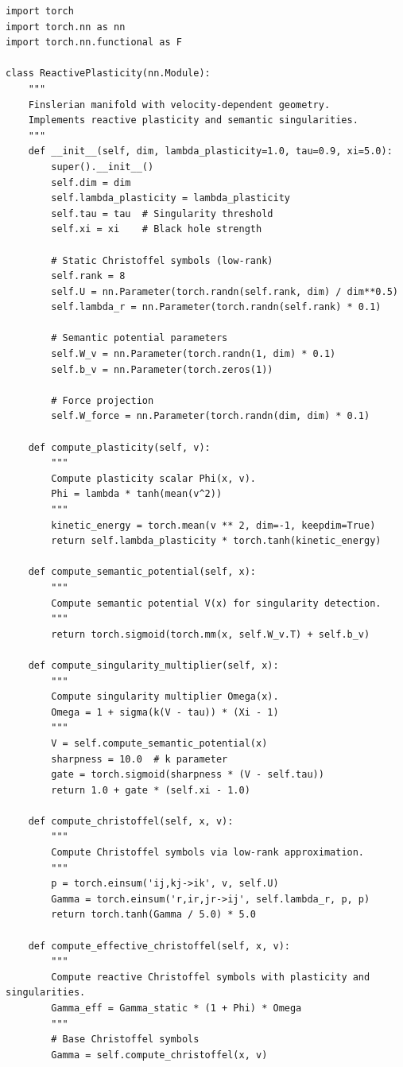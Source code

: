\documentclass[12pt,letterpaper,twoside]{article}
\begin{document}
\begin{verbatim}
import torch
import torch.nn as nn
import torch.nn.functional as F

class ReactivePlasticity(nn.Module):
    """
    Finslerian manifold with velocity-dependent geometry.
    Implements reactive plasticity and semantic singularities.
    """
    def __init__(self, dim, lambda_plasticity=1.0, tau=0.9, xi=5.0):
        super().__init__()
        self.dim = dim
        self.lambda_plasticity = lambda_plasticity
        self.tau = tau  # Singularity threshold
        self.xi = xi    # Black hole strength
        
        # Static Christoffel symbols (low-rank)
        self.rank = 8
        self.U = nn.Parameter(torch.randn(self.rank, dim) / dim**0.5)
        self.lambda_r = nn.Parameter(torch.randn(self.rank) * 0.1)
        
        # Semantic potential parameters
        self.W_v = nn.Parameter(torch.randn(1, dim) * 0.1)
        self.b_v = nn.Parameter(torch.zeros(1))
        
        # Force projection
        self.W_force = nn.Parameter(torch.randn(dim, dim) * 0.1)
        
    def compute_plasticity(self, v):
        """
        Compute plasticity scalar Phi(x, v).
        Phi = lambda * tanh(mean(v^2))
        """
        kinetic_energy = torch.mean(v ** 2, dim=-1, keepdim=True)
        return self.lambda_plasticity * torch.tanh(kinetic_energy)
    
    def compute_semantic_potential(self, x):
        """
        Compute semantic potential V(x) for singularity detection.
        """
        return torch.sigmoid(torch.mm(x, self.W_v.T) + self.b_v)
    
    def compute_singularity_multiplier(self, x):
        """
        Compute singularity multiplier Omega(x).
        Omega = 1 + sigma(k(V - tau)) * (Xi - 1)
        """
        V = self.compute_semantic_potential(x)
        sharpness = 10.0  # k parameter
        gate = torch.sigmoid(sharpness * (V - self.tau))
        return 1.0 + gate * (self.xi - 1.0)
    
    def compute_christoffel(self, x, v):
        """
        Compute Christoffel symbols via low-rank approximation.
        """
        p = torch.einsum('ij,kj->ik', v, self.U)
        Gamma = torch.einsum('r,ir,jr->ij', self.lambda_r, p, p)
        return torch.tanh(Gamma / 5.0) * 5.0
    
    def compute_effective_christoffel(self, x, v):
        """
        Compute reactive Christoffel symbols with plasticity and singularities.
        Gamma_eff = Gamma_static * (1 + Phi) * Omega
        """
        # Base Christoffel symbols
        Gamma = self.compute_christoffel(x, v)
        

\end{verbatim}
\end{document}
